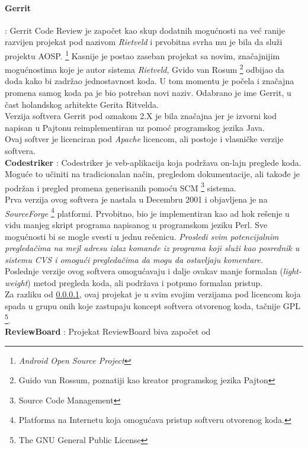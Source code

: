 \documentclass[a4paper]{article}
\begin{document}
\paragraph{Gerrit} \label{Gerrit} : Gerrit Code Review je započet kao skup dodatnih mogućnosti 
na već ranije razvijen projekat pod nazivom \emph{Rietveld} i prvobitna svrha mu je bila
da služi projektu AOSP. \footnote{\emph{Android Open Source Project}}
Kasnije je postao zaseban projekat sa novim, značajnijim mogućnostima koje je autor 
sistema \emph{Rietveld}, Gvido van Rosum \footnote{Guido van Rossum, poznatiji kao kreator
programskog jezika Pajton}
odbijao da doda kako bi zadržao jednostavnost koda.
U tom momentu je počela i značajna promena samog koda pa je bio potreban novi naziv.
Odabrano je ime Gerrit, u čast holandskog arhitekte Gerita Ritvelda.
\\
Verzija softvera Gerrit pod oznakom 2.X je bila značajna jer je izvorni kod napisan u Pajtonu
reimplementiran uz pomoć programskog jezika Java.
\cite{gerrit}
\\
Ovaj softver je licenciran pod \emph{Apache} licencom, ali postoje i vlasničke verzije softvera.
\\[0.4cm]
\textbf{Codestriker} : Codestriker je veb-aplikacija koja podržava on-lajn preglede koda.
Moguće to učiniti na tradicionalan način, pregledom dokumentacije, ali takođe je podržan i pregled promena generisanih pomoću SCM 
\footnote{Source Code Management} sistema.
\\
Prva verzija ovog softvera je nastala u Decembru 2001 i objavljena je na \emph{SourceForge} \footnote{Platforma na Internetu koja omogućava pristup softveru otvorenog koda.}
platformi.
Prvobitno, bio je implementiran kao ad hok rešenje u vidu manjeg skript programa napisanog u programskom jeziku Perl.
Sve mogućnosti bi se mogle svesti u jednu rečenicu. 
\emph{Prosledi svim potencijalnim pregledačima na mejl adresu izlaz
komande iz programa koji služi kao posrednik u sistemu CVS i omogući
pregledačima da mogu da ostavljaju komentare.}
\\
Poslednje verzije ovog softvera omogućavaju i dalje ovakav
manje formalan (\emph{light-weight}) metod pregleda koda, ali 
podržava i potpuno formalan pristup.
\\
Za razliku od \ref{Gerrit}, ovaj projekat je u svim svojim verzijama pod licencom
koja spada u grupu onih koje zastupaju koncept softvera otvorenog koda, tačnije GPL
\footnote{The GNU General Public License}.
\\[0.4cm]
\textbf{ReviewBoard} : Projekat ReviewBoard biva započet od 
\end{document}
